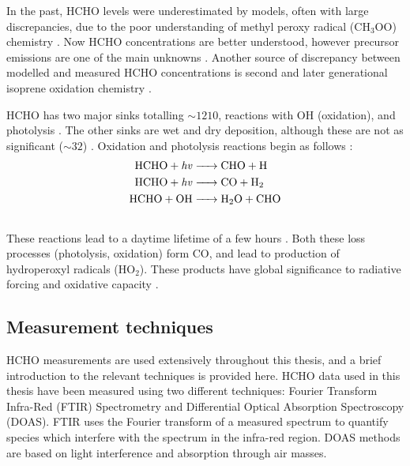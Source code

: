     In the past, HCHO levels were underestimated by models, often with large discrepancies, due to the poor understanding of methyl peroxy radical (CH$_3$OO) chemistry \parencite{Wagner2002}.
    Now HCHO concentrations are better understood, however precursor 
    emissions are one of the main unknowns 
    \parencite[e.g.,][]{Emmerson2016, Marvin2017}.
    Another source of discrepancy between modelled and measured HCHO concentrations is second and later generational isoprene oxidation chemistry \parencite{Marvin2017}.

    HCHO has two major sinks totalling $\sim 1210$\tgpyr, reactions with OH (oxidation), and photolysis \parencite{Levy1972, Crutzen1999, Wagner2002, FortemsCheiney2012, Kefauver2014}.
    The other sinks are wet and dry deposition, although these are not as significant ($\sim 32$\tgpyr) \parencite{Atkinson2000, FortemsCheiney2012}.
    Oxidation and photolysis reactions begin as follows \parencite{Ayers1997}:
    \begin{align*} %
      \label{Model:GC:Mechanisms:eqn_mechanisms}
        \ce{ 
          HCHO + \mathit{hv} -> & CHO + H \\ 
          HCHO + \mathit{hv} -> & CO + H2 \\ 
          HCHO + OH -> & H2O + CHO \\ 
        }
    \end{align*}
    These reactions lead to a daytime lifetime of a few hours \parencite{Atkinson2000, Millet2006}.
    Both these loss processes (photolysis, oxidation) form CO, and lead to production of hydroperoxyl radicals (HO$_2$).
    These products have global significance to radiative forcing and oxidative capacity \parencite{Franco2015}.
    
    
  \subsection{Measurement techniques}
    \label{LR:HCHO:Measurements}
    HCHO measurements are used extensively throughout this thesis, and a brief introduction to the relevant techniques is provided here.
    HCHO data used in this thesis have been measured using two different techniques: Fourier Transform Infra-Red (FTIR) Spectrometry and Differential Optical Absorption Spectroscopy (DOAS).
    FTIR uses the Fourier transform of a measured spectrum to quantify species which interfere with the spectrum in the infra-red region.
    DOAS methods are based on light interference and absorption through air masses.
    
